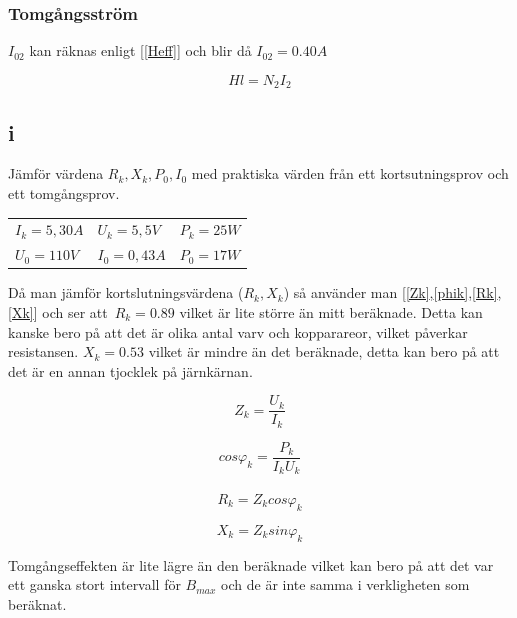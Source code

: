 \documentclass{article}
\begin{document}

\subsubsection{Tomgångsström}
$I_{02}$ kan räknas enligt [\ref{Heff}] och blir då $I_{02} = 0.40 A$

\begin{equation}
  H l = N_2 I_2
  \label{Heff}
\end{equation}

\subsection{i}
Jämför värdena $R_k,X_k,P_0,I_0$ med praktiska värden från ett kortsutningsprov och ett tomgångsprov.

\begin{tabular}{l l l}
  $I_k = 5,30 A$ & $U_k = 5,5 V $&$ P_k = 25 W$\\
  $U_0 = 110 V $&$ I_0 = 0,43 A $&$ P_0 = 17 W$\\
\end{tabular}

Då man jämför kortslutningsvärdena ($R_k,X_k$) så använder man [\ref{Zk},\ref{phik},\ref{Rk},\ref{Xk}] och ser att\
$R_k= 0.89$ vilket är lite större än mitt beräknade.
Detta kan kanske bero på att det är olika antal varv och kopparareor, vilket påverkar resistansen.
$X_k= 0.53$ vilket är mindre än det beräknade, detta kan bero på att det är en annan tjocklek på järnkärnan.

\begin{equation}
  Z_k=\frac{U_k}{I_k}
  \label{Zk}
\end{equation}

\begin{equation}
  cos\varphi_k=\frac{P_k}{I_k U_k}
  \label{phik}
\end{equation}
\\
\begin{equation}
  R_k=Z_kcos\varphi_k
  \label{Rk}
\end{equation}

\begin{equation}
  X_k=Z_ksin\varphi_k
  \label{Xk}
\end{equation}


Tomgångseffekten är lite lägre än den beräknade vilket kan bero på att det var ett ganska stort intervall för $B_{max}$ och de är inte samma i verkligheten som beräknat.
\end{document}
